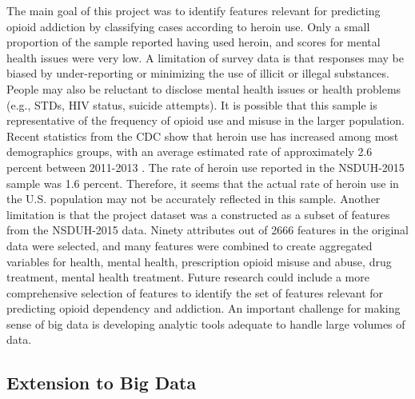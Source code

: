 \documentclass[sigconf]{acmart}
\begin{document}
The main goal of this project was to identify features relevant for predicting 
opioid addiction by classifying cases according to heroin use. Only a small 
proportion of the sample reported having used heroin, and scores for mental
health issues were very low. A limitation of survey data is that responses may 
be biased by under-reporting or minimizing the use of illicit or illegal 
substances. People may also be reluctant to disclose mental health issues or 
health problems (e.g., STDs, HIV status, suicide attempts). It is possible
that this sample is representative of the frequency of opioid use and misuse
in the larger population. Recent statistics from the CDC show that heroin use
has increased among most demographics groups, with an average estimated rate 
of approximately 2.6 percent between 2011-2013 \cite{cdc16}. The rate of heroin 
use reported in the NSDUH-2015 sample was 1.6 percent. Therefore, it seems
that the actual rate of heroin use in the U.S. population may not be accurately
reflected in this sample. Another limitation is that the project dataset was 
a constructed as a subset of features from the NSDUH-2015 data. Ninety 
attributes out of 2666 features in the original data were selected, and many 
features were combined to create aggregated variables for health, mental 
health, prescription opioid misuse and abuse, drug treatment, mental health
treatment. Future research could include a more comprehensive selection of
features to identify the set of features relevant for predicting opioid
dependency and addiction. An important challenge for making sense of big data 
is developing analytic tools adequate to handle large volumes of data.


\subsection{Extension to Big Data}
\end{document}
